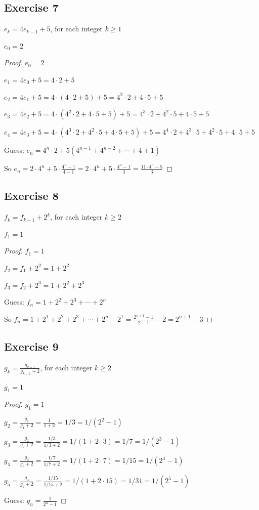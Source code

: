 \documentclass[14pt]{extarticle}
\newcommand{\dps}{\displaystyle}
\begin{document}
\subsection{Exercise 7}
\(e_k = 4e_{k-1} + 5\), for each integer \(k \geq 1\)

\(e_0 = 2\)

\begin{proof}
\(e_0 = 2\)

\(e_1 = 4e_0 + 5 = 4 \cdot 2 + 5\)

\(e_2 = 4e_1 + 5 = 4 \cdot (4 \cdot 2 + 5) + 5 = 4^2 \cdot 2 + 4 \cdot 5 + 5\)

\(e_3 = 4e_2 + 5 = 4 \cdot (4^2 \cdot 2 + 4 \cdot 5 + 5) + 5 = 4^3 \cdot 2 + 4^2 \cdot 5 + 4 \cdot 5 + 5\)

\(e_4 = 4e_3 + 5 = 4 \cdot (4^3 \cdot 2 + 4^2 \cdot 5 + 4 \cdot 5 + 5) + 5 
= 4^4 \cdot 2 + 4^3 \cdot 5 + 4^2 \cdot 5 + 4 \cdot 5 + 5\)

Guess: \(e_n = 4^n \cdot 2 + 5(4^{n-1} + 4^{n-2} + \cdots + 4 + 1)\)

So \(\dps e_n = 2 \cdot 4^n + 5 \cdot \frac{4^n - 1}{4-1} = 2 \cdot 4^n + 5 \cdot \frac{4^n - 1}{3} = \frac{11 \cdot 4^n - 5}{3}\)
\end{proof}

\subsection{Exercise 8}
\(f_k = f_{k-1} + 2^k\), for each integer \(k \geq 2\)

\(f_1 = 1\)

\begin{proof}
\(f_1 = 1\)

\(f_2 = f_1 + 2^2 = 1 + 2^2\)

\(f_3 = f_2 + 2^3 = 1 + 2^2 + 2^3\)

Guess: \(f_n = 1 + 2^2 + 2^3 + \cdots + 2^n\)

So \(f_n = 1 + 2^1 + 2^2 + 2^3 + \cdots + 2^n - 2^1 = \dps\frac{2^{n+1}-1}{2-1} - 2 = 2^{n+1} - 3\)
\end{proof}

\subsection{Exercise 9}
\(g_k = \dps \frac{g_{k-1}}{g_{k-1} + 2}\), for each integer \(k \geq 2\)

\(g_1 = 1\)

\begin{proof}
\(g_1 = 1\)

\(g_2 = \dps \frac{g_1}{g_1 + 2} = \frac{1}{1 + 2} = 1/3 = 1/(2^2 - 1)\)

\(g_3 = \dps \frac{g_2}{g_2 + 2} = \frac{1/3}{1/3 + 2} = 1/(1 + 2 \cdot 3) = 1 / 7 = 1 / (2^3 - 1)\)

\(g_4 = \dps \frac{g_3}{g_3 + 2} = \frac{1/7}{1/7 + 2} = 1/(1 + 2 \cdot 7) = 1/15 = 1 / (2^4 - 1)\)

\(g_5 = \dps \frac{g_4}{g_4 + 2} = \frac{1/15}{1/15 + 2} = 1/(1 + 2 \cdot 15) = 1/31 = 1 / (2^5 - 1)\)

Guess: \(\dps g_n = \frac{1}{2^n - 1}\)
\end{proof}
\end{document}
